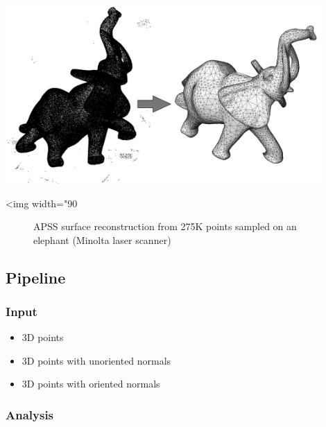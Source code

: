 \begin{center}
    \label{Surface_reconstruction_3-fig-introduction}
    \begin{ccTexOnly}
        \includegraphics[width=0.9\textwidth]{Surface_reconstruction_3/introduction} %
    \end{ccTexOnly}
    \begin{ccHtmlOnly}
        <img width="90%
    \end{ccHtmlOnly}
    \begin{figure}[h]
        \caption{APSS surface reconstruction from 275K points sampled on an elephant (Minolta laser scanner)}
    \end{figure}
\end{center}

\subsection{Pipeline}

\subsubsection{Input}

\begin{itemize}
\item 3D points
\item 3D points with unoriented normals
\item 3D points with oriented normals
\end{itemize}


\subsubsection{Analysis}

